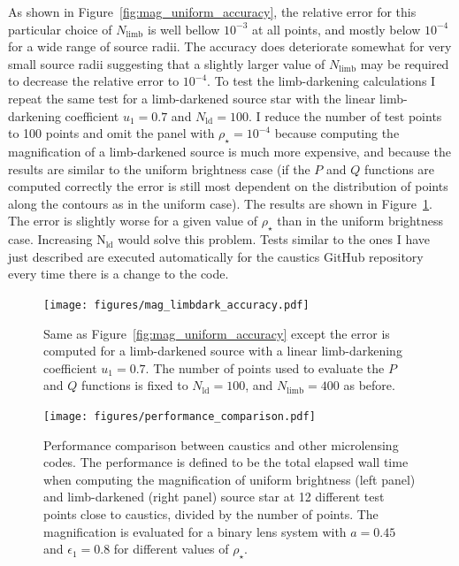 \documentclass[12pt,dvipsnames]{report}
\newcommand{\ssf}[1]{\textsf{#1}}
\begin{document}
As shown in Figure~\ref{fig:mag_uniform_accuracy}, the relative error for this  particular 
choice of $N_\mathrm{limb}$ is well bellow $10^{-3}$ at all points, and mostly below $10^{-4}$ 
for a wide range of source radii. The accuracy does deteriorate somewhat for very small 
source radii suggesting that a slightly larger value of $N_\mathrm{limb}$ may be required 
to decrease the relative error to $10^{-4}$.  To test the limb-darkening calculations 
I repeat the same test for a limb-darkened source star with the linear limb-darkening 
coefficient $u_1=0.7$ and $N_\mathrm{ld}=100$. I reduce the number of test points to 100 points and omit the panel
with $\rho_\star=10^{-4}$ because computing the magnification of a limb-darkened source 
is much more expensive, and because the results are similar to the uniform brightness case 
(if the $P$ and $Q$ functions are computed correctly the error is still most dependent on 
the distribution of points along the contours as in the uniform case).
The results are shown in Figure~\ref{fig:mag_limbdark_accuracy}. The error is slightly worse
for a given value of $\rho_\star$ than in the uniform brightness case. 
Increasing  $\mathrm{N}_\mathrm{ld}$ would solve this problem.
Tests similar to the ones I have just described are executed automatically for the 
\ssf{caustics} \ssf{GitHub} repository every time there is a change to the code.

\begin{figure}[t]
    \begin{centering}
        \texttt{[image: figures/mag\_limbdark\_accuracy.pdf]}
        \caption{Same as Figure~\ref{fig:mag_uniform_accuracy} except the error is computed 
        for a limb-darkened source with a linear limb-darkening coefficient $u_1=0.7$. The 
        number of points used to evaluate the $P$ and $Q$ functions is fixed to 
        $N_\mathrm{ld}=100$, and $N_\mathrm{limb}=400$ as before.}
            \label{fig:mag_limbdark_accuracy}
    \end{centering}
\end{figure}

\begin{figure}[t]
    \begin{centering}
        \texttt{[image: figures/performance\_comparison.pdf]}
        \caption{Performance comparison between \ssf{caustics} and other microlensing codes.
        The performance is defined to be the total elapsed wall time when computing the 
        magnification of uniform brightness (left panel) and limb-darkened (right panel) 
        source star at 12 different test points close to caustics, divided by the number of points.
        The magnification is evaluated for a binary lens system with $a=0.45$ and 
        $\epsilon_1=0.8$ for different values of $\rho_\star$.
        }
            \label{fig:performance_comparison}
    \end{centering}
\end{figure}
\end{document}
